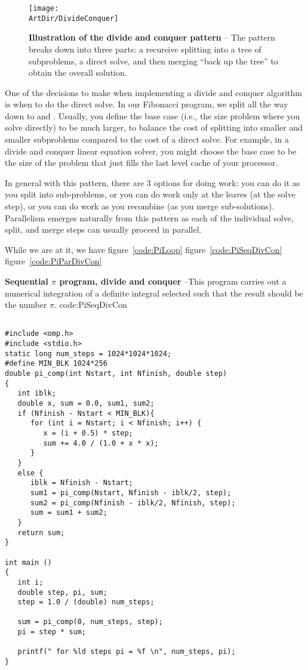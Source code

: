 \begin{figure}[!htbp]
\centering
\texttt{[image: \\ArtDir/DivideConquer]}
\centering
\caption
{\textbf{Illustration of the divide and conquer pattern} -- \small
The pattern breaks down
into three parts: a recursive splitting into a tree of subproblems, a direct solve, and 
then merging ``back up the tree'' to obtain the overall solution.
} 
\label{fig:divide_conquer}
\end{figure}

One of the decisions to make when implementing a divide and conquer algorithm is 
when to do the direct solve.
In our Fibonacci program, we split all the way down to  and .
Usually, you define the base case (i.e., the size problem where you solve directly) to be
much larger, to balance the cost of splitting into smaller and smaller subproblems compared to 
the cost of a direct solve.  For example, in a divide and conquer linear equation solver, you might
choose the base case to be the size of the problem that just fills the last level cache of your processor.  

In general with this pattern, there are 3 options for doing work: you can do it as you split into sub-problems, or
you can do work only at the leaves (at the solve step), or you can 
do work as you recombine (as you merge sub-solutions).   Parallelism emerges naturally from this pattern as each 
of the individual solve, split, and merge steps can usually proceed in parallel.   







While we are at it, we have figure~\ref{code:PiLoop} figure~\ref{code:PiSeqDivCon} figure~\ref{code:PiParDivCon}


\begin{CodeExample}%
{\textbf{Sequential $\pi$ program, divide and conquer} --\small This program carries out a numerical integration 
of a definite integral selected such that the result should be the number $\pi$.
}%
{code:PiSeqDivCon}
\begin{lstlisting}

#include <omp.h>
#include <stdio.h>
static long num_steps = 1024*1024*1024;
#define MIN_BLK 1024*256
double pi_comp(int Nstart, int Nfinish, double step)
{   
   int iblk;
   double x, sum = 0.0, sum1, sum2;
   if (Nfinish - Nstart < MIN_BLK){
      for (int i = Nstart; i < Nfinish; i++) {
         x = (i + 0.5) * step;
         sum += 4.0 / (1.0 + x * x);
      }
   }
   else {
      iblk = Nfinish - Nstart;
      sum1 = pi_comp(Nstart, Nfinish - iblk/2, step);
      sum2 = pi_comp(Nfinish - iblk/2, Nfinish, step);
      sum = sum1 + sum2;
   }
   return sum;
}

int main () 
{
   int i;
   double step, pi, sum;
   step = 1.0 / (double) num_steps;

   sum = pi_comp(0, num_steps, step);
   pi = step * sum;

   printf(" for %ld steps pi = %f \n", num_steps, pi);
} 
\end{lstlisting}
\end{CodeExample}

